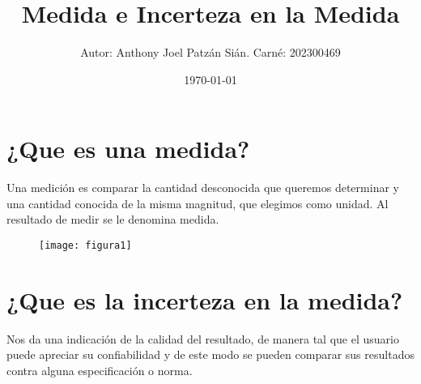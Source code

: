 \documentclass[11pt]{article}
\title{Medida e Incerteza en la Medida}
\author{Autor: Anthony Joel Patzán Sián.  Carné: 202300469}
\date{\today}
\begin{document}
\maketitle
\section{¿Que es una medida?}
Una medición es comparar la cantidad desconocida que queremos determinar y una cantidad conocida de la misma magnitud, que elegimos como unidad. Al resultado de medir se le denomina medida.

\begin{figure}[h]
	\texttt{[image: figura1]}
	\caption{}
	\label{fig:figura1}
\end{figure}

\section{¿Que es la incerteza en la medida?}
Nos da una indicación de la calidad del resultado, de manera tal que el usuario puede apreciar su confiabilidad y de este modo se pueden comparar sus resultados contra alguna especificación o norma.
\end{document}
